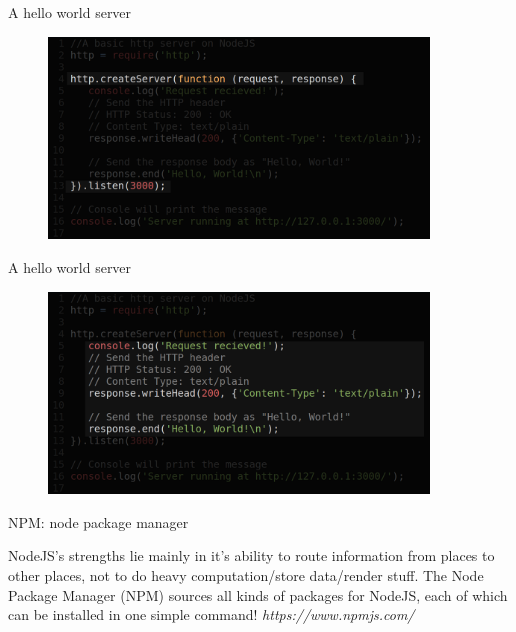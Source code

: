 \documentclass{beamer}
\begin{document}
\begin{frame}{A hello world server}

\begin{figure}[h]
\includegraphics[width=0.9\textwidth]{helloworld3}
\end{figure}

\end{frame}

\begin{frame}{A hello world server}

\begin{figure}[h]
\includegraphics[width=0.9\textwidth]{helloworld4}
\end{figure}

\end{frame}

\begin{frame}{NPM: node package manager}

NodeJS's strengths lie mainly in it's ability to route information from places to other places, not to do heavy computation/store data/render stuff.
\pause
The Node Package Manager (NPM) sources all kinds of packages for NodeJS, each of which can be installed in one simple command!
\pause
\textit{https://www.npmjs.com/}

\end{frame}
\end{document}
